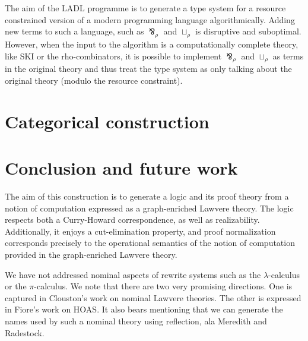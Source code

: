 \documentclass{llncs}
\renewcommand{\:}{\colon}
\newcommand{\pic}{$\pi$-calculus}
\newcommand{\lamc}{$\lambda$-calculus}
\begin{document}
The aim of the LADL programme is to generate a type system for a resource constrained version of a modern programming language algorithmically. Adding new terms to such a language, such as $\bindnasrepma_{\rho}$ and $\sqcup_{\rho}$ is disruptive and suboptimal. However, when the input to the algorithm is a computationally complete theory, like SKI or the rho-combinators, it is possible to implement $\bindnasrepma_{\rho}$ and $\sqcup_{\rho}$ as terms in the original theory and thus treat the type system as only talking about the original theory (modulo the resource constraint).

\section{Categorical construction}








\section{Conclusion and future work}

The aim of this construction is to generate a logic and its proof
theory from a notion of computation expressed as a graph-enriched
Lawvere theory. The logic respects both a Curry-Howard correspondence,
as well as realizability. Additionally, it enjoys a cut-elimination
property, and proof normalization corresponds precisely to the
operational semantics of the notion of computation provided in the
graph-enriched Lawvere theory.

We have not addressed nominal aspects of rewrite systems such as the
{\lamc} or the {\pic}. We note that there are two very
promising directions. One is captured in Clouston's work on nominal
Lawvere theories. \cite{DBLP:journals/jcss/Clouston14} The other is
expressed in Fiore's work on HOAS. \cite{DBLP:conf/csl/FioreH10} It
also bears mentioning that we can generate the names used by such a
nominal theory using reflection, ala Meredith and
Radestock. \cite{DBLP:conf/tgc/MeredithR05}
\end{document}
